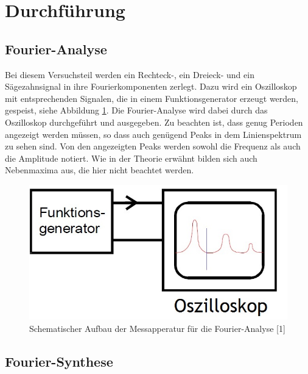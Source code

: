 \section{Durchführung}
\label{sec:Durchführung}

\subsection{Fourier-Analyse}

Bei diesem Versuchsteil werden ein Rechteck-, ein Dreieck- und 
ein Sägezahnsignal in ihre Fourierkomponenten zerlegt. Dazu wird
ein Oszilloskop mit entsprechenden Signalen, die in einem Funktionsgenerator 
erzeugt werden, gespeist, siehe Abbildung \ref{fig:aufbau}. 
Die Fourier-Analyse wird dabei durch das
Oszilloskop durchgeführt und ausgegeben. Zu beachten ist, dass genug
Perioden angezeigt werden müssen, so dass auch genügend Peaks in dem 
Linienspektrum zu sehen sind. Von den angezeigten Peaks werden sowohl
die Frequenz als auch die Amplitude notiert. Wie in der Theorie erwähnt
bilden sich auch Nebenmaxima aus, die hier nicht beachtet werden. 

\begin{figure}
  \centering
  \includegraphics[scale=0.2]{content/Aufbau_1.jpg}
  \caption{Schematischer Aufbau der Messapperatur für die Fourier-Analyse [1]}
  \label{fig:aufbau}
\end{figure}

\subsection{Fourier-Synthese}

